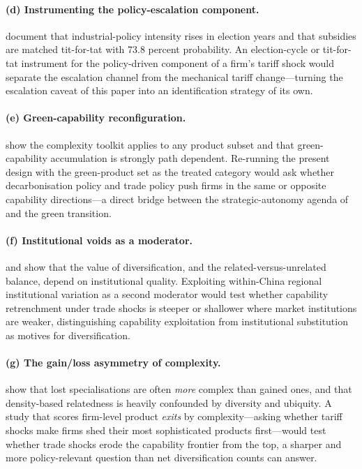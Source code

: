 \paragraph{(d) Instrumenting the policy-escalation component.}
\citet{evenett2024} document that industrial-policy intensity rises in election years
and that subsidies are matched tit-for-tat with 73.8 percent probability. An election-cycle
or tit-for-tat instrument for the policy-driven component of a firm's tariff shock
would separate the escalation channel from the mechanical tariff change---turning the
escalation caveat of this paper into an identification strategy of its own.

\paragraph{(e) Green-capability reconfiguration.}
\citet{mealy2022} show the complexity toolkit applies to any product subset and that
green-capability accumulation is strongly path dependent. Re-running the present design
with the green-product set as the treated category would ask whether decarbonisation
policy and trade policy push firms in the same or opposite capability directions---a
direct bridge between the strategic-autonomy agenda of \citet{cagnin2021} and the green
transition.

\paragraph{(f) Institutional voids as a moderator.}
\citet{delios2008} and \citet{boschma2015} show that the value of diversification, and
the related-versus-unrelated balance, depend on institutional quality. Exploiting
within-China regional institutional variation as a second moderator would test whether
capability retrenchment under trade shocks is steeper or shallower where market
institutions are weaker, distinguishing capability exploitation from
institutional substitution as motives for diversification.

\paragraph{(g) The gain/loss asymmetry of complexity.}
\citet{nomaler2023} show that lost specialisations are often \emph{more} complex than
gained ones, and that density-based relatedness is heavily confounded by diversity and
ubiquity. A study that scores firm-level product \emph{exits} by complexity---asking
whether tariff shocks make firms shed their most sophisticated products first---would
test whether trade shocks erode the capability frontier from the top, a sharper and
more policy-relevant question than net diversification counts can answer.
